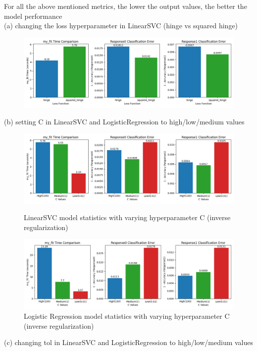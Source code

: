 \documentclass{article}
\begin{document}
For all the above mentioned metrics, the lower the output values, the better the model performance\\
\newpage
(a) changing the loss hyperparameter in LinearSVC (hinge vs squared hinge)
\begin{figure}[H]
  \centering
  \includegraphics[scale=0.4]{loss_parameter.png}
  \caption{}
\end{figure}
(b) setting C in LinearSVC and LogisticRegression to high/low/medium values
\begin{figure}[H]
  \centering
  \includegraphics[scale=0.4]{C_SVC.png}
  \caption{LinearSVC model statistics with varying hyperparameter C (inverse regularization)}
  \includegraphics[scale=0.4]{C_Log.png}
  \caption{Logistic Regression model statistics with varying hyperparameter C (inverse regularization)}
\end{figure}
\newpage
(c) changing tol in LinearSVC and LogisticRegression to high/low/medium values
\end{document}
